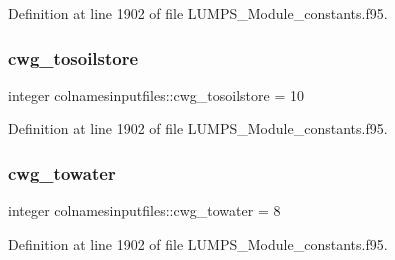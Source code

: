 Definition at line 1902 of file L\+U\+M\+P\+S\+\_\+\+Module\+\_\+constants.\+f95.

\mbox{\label{namespacecolnamesinputfiles_a00e15e85f40dc69c021c7686e37a496a}} 
\subsubsection{\texorpdfstring{cwg\+\_\+tosoilstore}{cwg\_tosoilstore}}
{\footnotesize\ttfamily integer colnamesinputfiles\+::cwg\+\_\+tosoilstore = 10}



Definition at line 1902 of file L\+U\+M\+P\+S\+\_\+\+Module\+\_\+constants.\+f95.

\mbox{\label{namespacecolnamesinputfiles_a5d8e3bc52b4085fc02c87b72863097fc}} 
\subsubsection{\texorpdfstring{cwg\+\_\+towater}{cwg\_towater}}
{\footnotesize\ttfamily integer colnamesinputfiles\+::cwg\+\_\+towater = 8}



Definition at line 1902 of file L\+U\+M\+P\+S\+\_\+\+Module\+\_\+constants.\+f95.

